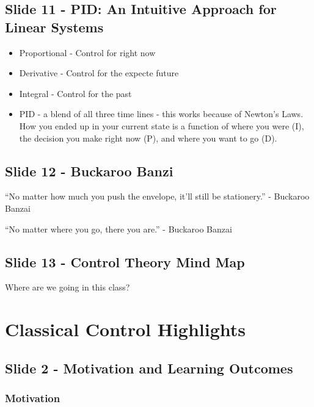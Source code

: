 \documentclass[
  letterpaper,
  DIV=11,
  numbers=noendperiod]{scrreprt}
\providecommand{\tightlist}{%
  \setlength{\itemsep}{0pt}\setlength{\parskip}{0pt}}
\begin{document}
\section{Slide 11 - PID: An Intuitive Approach for Linear
Systems}\label{slide-11---pid-an-intuitive-approach-for-linear-systems}

\begin{itemize}
\tightlist
\item
  Proportional - Control for right now
\item
  Derivative - Control for the expecte future
\item
  Integral - Control for the past
\item
  PID - a blend of all three time lines - this works because of Newton's
  Laws. How you ended up in your current state is a function of where
  you were (I), the decision you make right now (P), and where you want
  to go (D).
\end{itemize}

\section{Slide 12 - Buckaroo Banzi}\label{slide-12---buckaroo-banzi}

``No matter how much you push the envelope, it'll still be stationery.''
- Buckaroo Banzai

``No matter where you go, there you are.'' - Buckaroo Banzai

\section{Slide 13 - Control Theory Mind
Map}\label{slide-13---control-theory-mind-map}

Where are we going in this class?


\chapter{Classical Control
Highlights}\label{classical-control-highlights}

\section{Slide 2 - Motivation and Learning
Outcomes}\label{slide-2---motivation-and-learning-outcomes-1}

\subsection{Motivation}\label{motivation-1}
\end{document}
